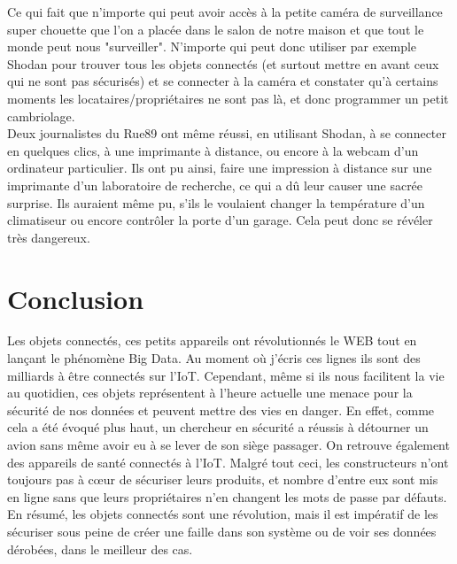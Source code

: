 \documentclass[a4paper]{report}
\begin{document}
	Ce qui fait que n'importe qui peut avoir accès à la petite caméra de surveillance super chouette que l'on a placée dans le salon de notre maison et que tout le monde peut nous "surveiller". N'importe qui peut donc utiliser par exemple Shodan pour trouver tous les objets connectés (et surtout mettre en avant ceux qui ne sont pas sécurisés) et se connecter à la caméra et constater qu'à certains moments les locataires/propriétaires ne sont pas là, et donc programmer un petit cambriolage.\\ 

	Deux journalistes du Rue89 ont même réussi, en utilisant Shodan, à se connecter en quelques clics, à une imprimante à distance, ou encore à la webcam d'un ordinateur particulier. Ils ont pu ainsi, faire une impression à distance sur une imprimante d'un laboratoire de recherche, ce qui a dû leur causer une sacrée surprise.
	Ils auraient même pu, s'ils le voulaient changer la température d'un climatiseur ou encore contrôler la porte d'un garage. Cela peut donc se révéler très dangereux. 	
	
	
	\section{Conclusion}
	
	Les objets connectés, ces petits appareils ont révolutionnés le WEB tout en lançant le phénomène Big Data. Au moment où j'écris ces
	lignes ils sont des milliards à être connectés sur l'IoT. Cependant, même si ils nous facilitent la vie au quotidien, ces objets
	représentent à l'heure actuelle une menace pour la sécurité de nos données et peuvent mettre des vies en danger. En effet, comme cela
	a été évoqué plus haut, un chercheur en sécurité a réussis à détourner un avion sans même avoir eu à se lever de son siège passager. On
	retrouve également des appareils de santé connectés à l'IoT. Malgré tout ceci, les constructeurs n'ont toujours pas à cœur de sécuriser
	leurs produits, et nombre d'entre eux sont mis en ligne sans que leurs propriétaires n'en changent les mots de passe par défauts.\\
	En résumé, les objets connectés sont une révolution, mais il est impératif de les sécuriser sous peine de créer une faille dans son système
	ou de voir ses données dérobées, dans le meilleur des cas.
	
\end{document}
